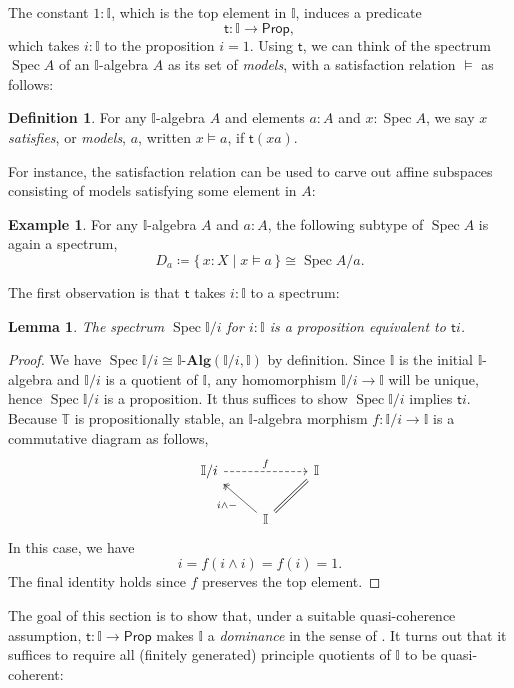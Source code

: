 \documentclass[a4paper,12pt]{amsart}
\newtheorem{lemma}[theorem]{Lemma}
\theoremstyle{definition}
\newtheorem{example}[theorem]{Example}
\newtheorem{definition}[theorem]{Definition}
\newcommand{\mb}[1]{\mathbf{#1}}
\newcommand{\mbb}[1]{\mathbb{#1}}
\newcommand{\T}{\mbb T}
\newcommand{\I}{\mbb I}
\newcommand{\ms}[1]{\mathsf{#1}}
\newcommand{\alg}{\text{-}\mb{Alg}}
\newcommand{\scomp}[2]{\{\,#1\mid#2\,\}}
\newcommand{\pp}{\ms{Prop}}
\newcommand{\spec}{\operatorname{Spec}}
\begin{document}
The constant $1 : \I$, which is the top element in $\I$, induces a predicate
\[ \ms t \colon \I \to \pp, \]
which takes $i : \I$ to the proposition $i = 1$. Using $\ms t$, we can think of the spectrum $\spec A$ of an $\I$-algebra $A$ as its set of \emph{models}, with a satisfaction relation $\models$ as follows:

\begin{definition}
  For any $\I$-algebra $A$ and elements $a:A$ and $x:\spec A$, we say $x$ \emph{satisfies}, or \emph{models}, $a$, written $x \models a$, if $\ms t(xa)$.
\end{definition}

For instance, the satisfaction relation can be used to carve out affine subspaces consisting of models satisfying some element in $A$:

\begin{example}
  For any $\I$-algebra $A$ and $a:A$, the following subtype of $\spec A$ is again a spectrum,
  \[ D_a \coloneq \scomp{x : X}{x \models a} \cong \spec A/a. \]
\end{example}

The first observation is that $\ms t$ takes $i : \I$ to a spectrum:

\begin{lemma}\label{lem:openpropaffine}
  The spectrum $\spec\I/i$ for $i:\I$ is a proposition equivalent to $\ms ti$.
\end{lemma}
\begin{proof}
  We have $\spec \I/i \cong \I\alg(\I/i,\I)$ by definition. Since $\I$ is the initial $\I$-algebra and $\I/i$ is a quotient of $\I$, any homomorphism $\I/i \to \I$ will be unique, hence $\spec\I/i$ is a proposition. It thus suffices to show $\spec\I/i$ implies $\ms ti$. Because $\T$ is propositionally stable, an $\I$-algebra morphism $f \colon \I/i \to \I$ is a commutative diagram as follows,
  \[
  \begin{tikzcd}
    \I/i \ar[rr, dashed, "f"] & & \I \\ 
    & \I \ar[ul, two heads, "i \wedge -"] \ar[ur, equal]
  \end{tikzcd}
  \]
  In this case, we have
  \[ i = f(i \wedge i) = f(i) = 1. \]
  The final identity holds since $f$ preserves the top element. 
\end{proof}

The goal of this section is to show that, under a suitable quasi-coherence assumption, $\ms t \colon \I \to \pp$ makes $\I$ a \emph{dominance} in the sense of \citet{rosolini1986continuity}. It turns out that it suffices to require all (finitely generated) principle quotients of $\I$ to be quasi-coherent:
\end{document}
